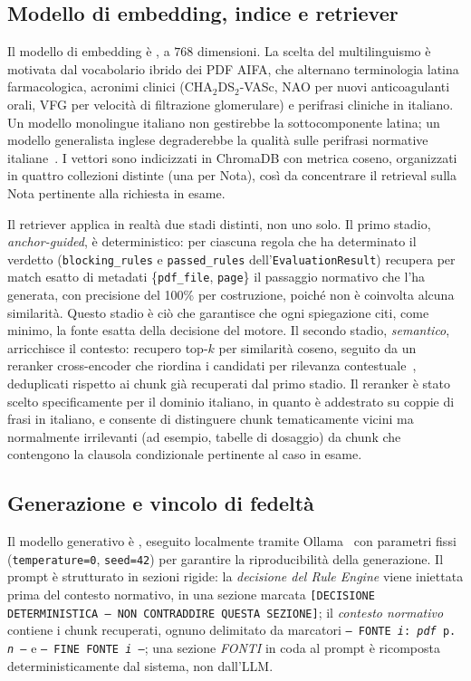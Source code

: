 \subsection{Modello di embedding, indice e retriever}
\label{subsec:embedding-retriever}

Il modello di embedding è \embedmodel, a $768$ dimensioni.
La scelta del multilinguismo è motivata dal vocabolario ibrido dei PDF AIFA,
che alternano terminologia latina farmacologica, acronimi clinici
(CHA$_2$DS$_2$-VASc, NAO per nuovi anticoagulanti orali, VFG per velocità di filtrazione glomerulare) e perifrasi cliniche in italiano.
Un modello monolingue italiano non gestirebbe la sottocomponente latina;
un modello generalista inglese degraderebbe la qualità sulle perifrasi
normative italiane~\cite{reimers2019sbert}.
I vettori sono indicizzati in ChromaDB con metrica coseno, organizzati
in quattro collezioni distinte (una per Nota), così da concentrare il
retrieval sulla Nota pertinente alla richiesta in esame.

Il retriever applica in realtà due stadi distinti, non uno solo. Il primo
stadio, \emph{anchor-guided}, è deterministico: per ciascuna regola che ha
determinato il verdetto (\texttt{blocking\_rules} e \texttt{passed\_rules}
dell'\texttt{EvaluationResult}) recupera per match esatto di metadati
\{\texttt{pdf\_file}, \texttt{page}\} il passaggio normativo che l'ha
generata, con precisione del 100\% per costruzione, poiché non è coinvolta
alcuna similarità. Questo stadio è ciò che garantisce che ogni spiegazione
citi, come minimo, la fonte esatta della decisione del motore. Il secondo
stadio, \emph{semantico}, arricchisce il contesto: recupero top-$k$ per
similarità coseno, seguito da un reranker cross-encoder \reranker{}
che riordina i candidati per rilevanza contestuale~\cite{nogueira2019passage},
deduplicati rispetto ai chunk già recuperati dal primo stadio.
Il reranker è stato scelto specificamente per il dominio italiano, in quanto
è addestrato su coppie di frasi in italiano, e consente di distinguere
chunk tematicamente vicini ma normalmente irrilevanti (ad esempio,
tabelle di dosaggio) da chunk che contengono la clausola condizionale
pertinente al caso in esame.

\subsection{Generazione e vincolo di fedeltà}
\label{subsec:generazione}

Il modello generativo è \llmmodel, eseguito localmente tramite
Ollama~\cite{ollama2024} con parametri fissi (\texttt{temperature=0},
\texttt{seed=42}) per garantire la riproducibilità della generazione.
Il prompt è strutturato in sezioni rigide: la \emph{decisione del Rule Engine}
viene iniettata prima del contesto normativo, in una sezione marcata
\texttt{[DECISIONE DETERMINISTICA --- NON CONTRADDIRE QUESTA SEZIONE]};
il \emph{contesto normativo} contiene i chunk recuperati, ognuno delimitato
da marcatori \texttt{--- FONTE \textit{i}: \textit{pdf} p.\,\textit{n} ---}
e \texttt{--- FINE FONTE \textit{i} ---};
una sezione \emph{FONTI} in coda al prompt è ricomposta deterministicamente
dal sistema, non dall'LLM.

